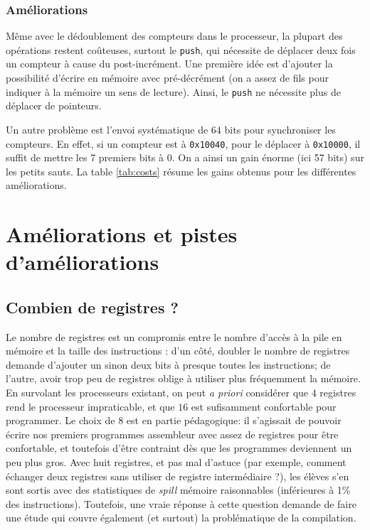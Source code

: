 \documentclass[architecture]{compas2018}
\begin{document}
\subsubsection{Améliorations\label{addr:amel}}
Même avec le dédoublement des compteurs dans le processeur, la plupart des opérations restent coûteuses, surtout le \texttt{push}, qui nécessite de déplacer deux fois un compteur à cause du post-incrément. Une première idée est d'ajouter la possibilité d'écrire en mémoire avec pré-décrément (on a assez de fils pour indiquer à la mémoire un sens de lecture). Ainsi, le \texttt{push} ne nécessite plus de déplacer de pointeurs.\par
Un autre problème est l'envoi systématique de $64$ bits pour synchroniser les compteurs. En effet, si un compteur est à \texttt{0x10040}, pour le déplacer à \texttt{0x10000}, il suffit de mettre les 7 premiers bits à 0. On a ainsi un gain énorme (ici 57 bits) sur les petits sauts. La table \ref{tab:costs} résume les gains obtenus pour les différentes améliorations.


\section{Améliorations et pistes d'améliorations \label{sec:amelioration}}
\subsection{Combien de registres ?}
Le nombre de registres est un compromis entre le nombre d'accès à la pile en mémoire et la taille des instructions :
d'un côté, doubler le nombre de registres demande d'ajouter un sinon deux bits à presque toutes les instructions;
de l'autre, avoir trop peu de registres oblige à utiliser plus fréquemment la mémoire.
En survolant les processeurs existant, on peut {\it a priori} considérer que $4$ registres rend le processeur impraticable, et que $16$ est sufisamment confortable pour programmer.
Le choix de 8 est en partie pédagogique: il s'agissait de pouvoir écrire nos premiers programmes assembleur avec assez de registres pour être confortable, et toutefois d'être contraint dès que les programmes deviennent un peu plus gros. 
Avec huit registres, et pas mal d'astuce (par exemple, comment échanger deux registres sans utiliser de registre intermédiaire ?), les élèves s'en sont sortis avec des statistiques de \emph{spill} mémoire raisonnables (inférieures à 1\% des instructions).
Toutefois, une vraie réponse à cette question demande de faire une étude qui couvre également (et surtout) la problématique de la compilation.
\end{document}
